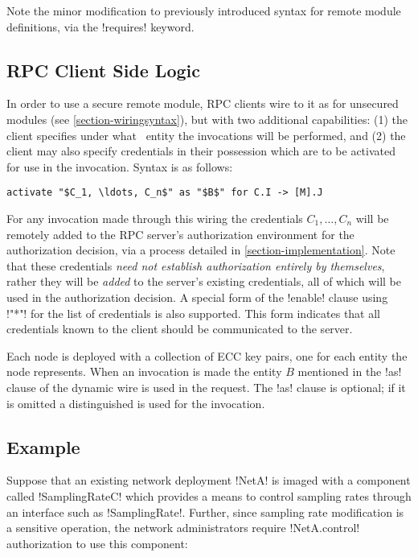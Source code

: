 Note the minor modification to previously introduced syntax for remote module definitions, via
the !requires! keyword.

\subsection{RPC Client Side Logic}
\label{section-rpc-client-side}

In order to use a secure remote module, RPC clients wire to it as for unsecured modules (see
\autoref{section-wiringsyntax}), but with two additional capabilities: (1) the client specifies
under what \RT\ entity the invocations will be performed, and (2) the client may also specify
credentials in their possession which are to be activated for use in the invocation. Syntax is
as follows:
\begin{lstlisting}[mathescape=true]
activate "$C_1, \ldots, C_n$" as "$B$" for C.I -> [M].J
\end{lstlisting}
For any invocation made through this wiring the credentials $C_1, \ldots, C_n$ will be remotely
added to the RPC server's authorization environment for the authorization decision, via a
process detailed in \autoref{section-implementation}. Note that these credentials \emph{need not
  establish authorization entirely by themselves}, rather they will be \emph{added} to the
server's existing credentials, all of which will be used in the authorization decision. A
special form of the !enable! clause using !"*"! for the list of credentials is also supported.
This form indicates that all credentials known to the client should be communicated to the
server.

Each node is deployed with a collection of ECC key pairs, one for each entity the node
represents. When an invocation is made the entity $B$ mentioned in the !as! clause of the
dynamic wire is used in the request. The !as! clause is optional; if it is omitted a
distinguished  is used for the invocation.

\subsection{Example}
\label{section-security-example}

Suppose that an existing network deployment !NetA! is imaged with a component called
!SamplingRateC! which provides a means to control sampling rates through an interface such as
!SamplingRate!. Further, since sampling rate modification is a sensitive operation, the network
administrators require !NetA.control! authorization to use this component:

